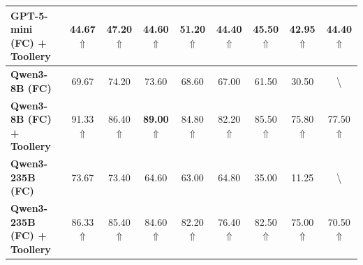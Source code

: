 \begin{table}[htb]
{\begin{tabular}{lcccccccc}
\textbf{GPT-5-mini (FC) + Toollery}         & 44.67 $\Uparrow$ & 47.20 $\Uparrow$ & 44.60 $\Uparrow$ & 51.20 $\Uparrow$ & 44.40 $\Uparrow$ & 45.50 $\Uparrow$ & 42.95 $\Uparrow$ & 44.40 $\Uparrow$            \\ \hline
\textbf{Qwen3-8B (FC)}                      & 69.67 & 74.20 & 73.60 & 68.60 & 67.00 & 61.50 & 30.50 & \textbackslash{} \\
\textbf{Qwen3-8B (FC) + Toollery}           & 91.33 $\Uparrow$ & 86.40 $\Uparrow$ & \textbf{89.00} $\Uparrow$ & 84.80 $\Uparrow$ & 82.20 $\Uparrow$ & 85.50 $\Uparrow$ & 75.80 $\Uparrow$ & 77.50 $\Uparrow$            \\ \hline
\textbf{Qwen3-235B (FC)}                    & 73.67 & 73.40 & 64.60 & 63.00 & 64.80 & 35.00 & 11.25 & \textbackslash{} \\
\textbf{Qwen3-235B (FC) + Toollery}         & 86.33 $\Uparrow$ & 85.40 $\Uparrow$ & 84.60 $\Uparrow$ & 82.20 $\Uparrow$ & 76.40 $\Uparrow$ & 82.50 $\Uparrow$ & 75.00 $\Uparrow$ & 70.50 $\Uparrow$            \\\hline \hline
\end{tabular}
}
\vskip -0.1in
\end{table}
